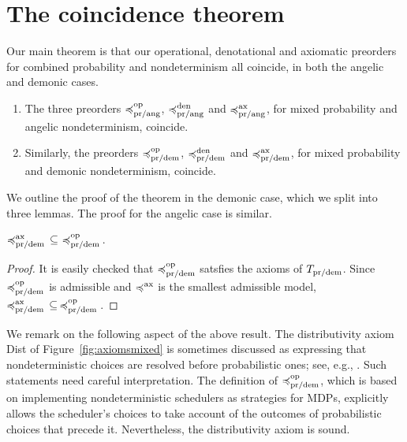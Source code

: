 \section{The coincidence theorem}
\label{section:equivalence}

Our main theorem is that our operational, denotational and axiomatic preorders for combined probability and nondeterminism all coincide, in both the angelic and demonic cases.
\begin{theorem} \leavevmode
\begin{enumerate} 
\item The three preorders $\preccurlyeq^{\text{op}}_{\text{pr/ang}}$, $\preccurlyeq^{\text{den}}_{\text{pr/ang}}$ and $\preccurlyeq^{\text{ax}}_{\text{pr/ang}}$, for mixed probability and angelic nondeterminism, coincide.

\item Similarly, the preorders $\preccurlyeq^{\text{op}}_{\text{pr/dem}}$, $\preccurlyeq^{\text{den}}_{\text{pr/dem}}$ and $\preccurlyeq^{\text{ax}}_{\text{pr/dem}}$,
for mixed probability and demonic nondeterminism, coincide.
\end{enumerate}
\end{theorem}

\noindent
We outline the proof of the theorem in the demonic case, which we split into three lemmas. The proof for the angelic case is similar. 
\begin{lemma}
${\preccurlyeq^{\text{ax}}_{\text{pr/dem}}} \, \subseteq \, \, \preccurlyeq^{\text{op}}_{\text{pr/dem}}\,$.
\end{lemma}
\begin{proof}
 It is easily checked that $\preccurlyeq^{\text{op}}_{\text{pr/dem}}$ satsfies the axioms
 of $T_{\text{pr/dem}}$.  Since $\preccurlyeq^{\text{op}}_{\text{pr/dem}}$ is admissible and 
$\preccurlyeq^{\text{ax}}$ is the smallest admissible model, ${\preccurlyeq^{\text{ax}}_{\text{pr/dem}}} \, \subseteq \, \preccurlyeq^{\text{op}}_{\text{pr/dem}}\,$.
\end{proof}
%
\noindent
We remark on the following aspect of the above result.
The distributivity axiom Dist of Figure~\ref{fig:axiomsmixed} is sometimes discussed as expressing that  nondeterministic choices  are  resolved before probabilistic ones; see, e.g., \cite{KeimelP2016}. Such statements need careful interpretation. 
The definition of $\preccurlyeq^{\text{op}}_{\text{pr/dem}}$, which is based on implementing nondeterministic schedulers as strategies for MDPs,
explicitly allows the  scheduler's choices to take account of the outcomes of probabilistic choices that precede it. Nevertheless, the distributivity axiom is sound.

